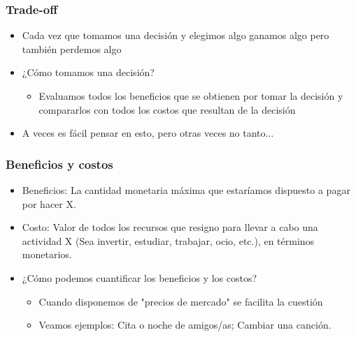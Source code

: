 \documentclass{beamer}
\begin{document}
\begin{frame}
\frametitle{Trade-off}
\begin{itemize}
    \item Cada vez que tomamos una decisión y elegimos algo ganamos algo pero también perdemos algo \vspace{2mm}
    \item ¿Cómo tomamos una decisión? 
    \begin{itemize}
        \item Evaluamos todos los beneficios que se obtienen por tomar la decisión y compararlos con todos los costos que resultan de la decisión
        \vspace{1mm}
    \end{itemize}
    \item A veces es fácil pensar en esto, pero otras veces no tanto...
\end{itemize} 
\end{frame}

\begin{frame}
\frametitle{Beneficios y costos}
\begin{itemize}
    \item Beneficios: La cantidad monetaria máxima que estaríamos dispuesto a pagar por hacer X. \vspace{2mm}
    \item Costo: Valor de todos los recursos que resigno para llevar a cabo una actividad X (Sea invertir, estudiar, trabajar, ocio, etc.), en términos monetarios.  \vspace{2mm}
    \item ¿Cómo podemos cuantificar los beneficios y los costos? 
    \begin{itemize}
    \item Cuando disponemos de "precios de mercado" se facilita la cuestión
    \item Veamos ejemplos: Cita o noche de amigos/as; Cambiar una canción.
    
    \end{itemize}
\end{itemize} 
\end{frame}
\end{document}
